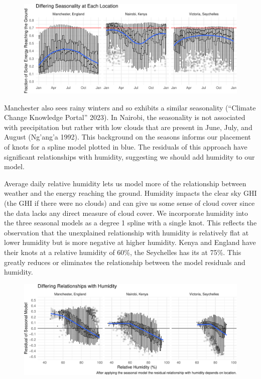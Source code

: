 \documentclass[
  letterpaper,
  DIV=11,
  numbers=noendperiod]{scrartcl}
\begin{document}
\begin{figure}

{\centering \includegraphics{FinalReport_files/figure-pdf/all energy fraction-1.pdf}

}

\end{figure}

Manchester also sees rainy winters and so exhibits a similar seasonality
({``Climate Change Knowledge Portal''} 2023). In Nairobi, the
seasonality is not associated with precipitation but rather with low
clouds that are present in June, July, and August (Ng'ang'a 1992). This
background on the seasons informs our placement of knots for a spline
model plotted in blue. The residuals of this approach have significant
relationships with humidity, suggesting we should add humidity to our
model.

Average daily relative humidity lets us model more of the relationship
between weather and the energy reaching the ground. Humidity impacts the
clear sky GHI (the GHI if there were no clouds) and can give us some
sense of cloud cover since the data lacks any direct measure of cloud
cover. We incorporate humidity into the three seasonal models as a
degree 1 spline with a single knot. This reflects the observation that
the unexplained relationship with humidity is relatively flat at lower
humidity but is more negative at higher humidity. Kenya and England have
their knots at a relative humidity of 60\%, the Seychelles has its at
75\%. This greatly reduces or eliminates the relationship between the
model residuals and humidity.

\begin{figure}

{\centering \includegraphics{FinalReport_files/figure-pdf/seasonal residuals-1.pdf}

}

\end{figure}
\end{document}
